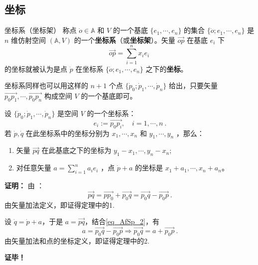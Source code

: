 \subsection{坐标}
\begin{definition}{坐标系（坐标架）}
称点 $\dot o\in\mathbb A$ 和 $V$ 的一个基底 $\{e_1,\cdots,e_n\}$ 的集合 $\{\dot o;e_1,\cdots,e_n\}$ 是 $n$ 维仿射空间 $(\mathbb A,V)$ 的一个\textbf{坐标系}（或\textbf{坐标架}）。矢量 $\overrightarrow{op}$ 在基底 ${e_i}$ 下
\begin{equation}
\overrightarrow{op}=\sum_{i=1}^n x_ie_i~
\end{equation}
的坐标就被认为是点 $\dot p$ 在坐标系 $\{\dot o;e_1,\cdots,e_n\}$ 之下的\textbf{坐标}。
\end{definition}
坐标系同样也可以用这样的 $n+1$ 个点 $\{\dot p_0;\dot p_1,\cdots,\dot p_n\}$ 给出，只要矢量 $\overrightarrow{p_0p_1},\cdots,\overrightarrow{p_0p_n}$ 构成空间 $V$ 的一个基底即可。
\begin{theorem}{}\label{the_AfSp_2}
设 $\{\dot p_0;\dot p_1,\cdots,\dot p_n\}$ 是空间 $V$ 的一个坐标系：
\begin{equation}
e_i:=\overrightarrow{p_0 p_i},\quad i=1,\cdots,n~.
\end{equation}
若 $\dot p,\dot q$ 在此坐标系中的坐标分别为 $x_1,\cdots,x_n$ 和 $y_1,\cdots,y_n$ ，那么：
\begin{enumerate}
\item 矢量 $\overrightarrow{pq}$ 在此基底之下的坐标为 $y_1-x_1,\cdots,y_n-x_n$;
\item 对任意矢量 $a=\sum\limits_{i=1}^n a_ie_i$ ，点 $\dot p+a$ 的坐标是 $x_1+a_1,\cdots,x_n+a_n$。
\end{enumerate}
\end{theorem} 
\textbf{证明：} 由 ：
\begin{equation}\label{eq_AfSp_2}
\overrightarrow{pq}=\overrightarrow{pp_0}+\overrightarrow{p_0q}=\overrightarrow{p_0q}-\overrightarrow{p_0p}~.
\end{equation}
由矢量加法定义，即证得定理中的1.

设 $\dot q=\dot p+a$，于是 $a=\overrightarrow{pq}$，结合\autoref{eq_AfSp_2}，有
\begin{equation}
a=\overrightarrow{p_0q}-\overrightarrow{p_0p}\Rightarrow \overrightarrow{p_0q}=a+\overrightarrow{p_0p}~.
\end{equation}
由矢量加法和点的坐标定义，即证得定理中的2.

\textbf{证毕！}
